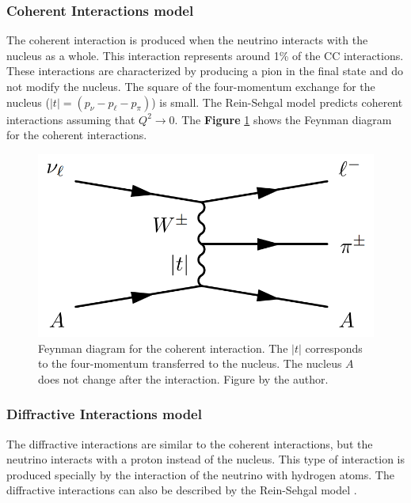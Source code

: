 \subsubsection{Coherent Interactions model}
\label{Cap:Int:NuInteractions:Coherent}

The coherent interaction is produced when the neutrino interacts with the nucleus as a whole. This interaction represents around 1\% of the CC interactions. These interactions are characterized by producing a pion in the final state and do not modify the nucleus. The square of the four-momentum exchange for the nucleus ($|t|=(p_\nu-p_\ell-p_\pi)$) is small. The Rein-Sehgal model \cite{REINcoh198329} predicts coherent interactions assuming that $Q^2 \rightarrow 0$. The \textbf{Figure} \ref{fig:Int:NuInteractions:Coherent} shows the Feynman diagram for the coherent interactions.


\begin{figure}[!htb]
    \centering
    \includegraphics[scale=0.3]{Figures/Chapter1/CoherentFeynman.png}
    \caption{Feynman diagram for the coherent interaction. The $|t|$ corresponds to the four-momentum transferred to the nucleus. The nucleus $A$ does not change after the interaction. Figure by the author.}
    \label{fig:Int:NuInteractions:Coherent}
\end{figure}

\subsubsection{Diffractive Interactions model}
\label{Cap:Int:NuInteractions:Diffractive}

The diffractive interactions are similar to the coherent interactions, but the neutrino interacts with a proton instead of the nucleus. This type of interaction is produced specially by the interaction of the neutrino with hydrogen atoms. The diffractive interactions can also be described by the Rein-Sehgal model \cite{REINcoh198329}.

